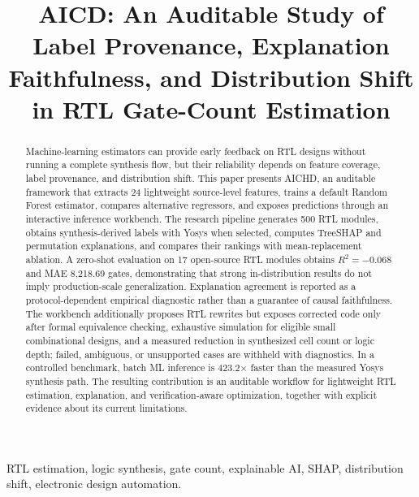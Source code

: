 \documentclass[conference]{IEEEtran}
\begin{document}
\title{AICD: An Auditable Study of Label Provenance, Explanation Faithfulness, and Distribution Shift in RTL Gate-Count Estimation}

\author{
}

\maketitle

\begin{abstract}
Machine-learning estimators can provide early feedback on RTL designs without running a complete synthesis flow, but their reliability depends on feature coverage, label provenance, and distribution shift. This paper presents AICHD, an auditable framework that extracts 24 lightweight source-level features, trains a default Random Forest estimator, compares alternative regressors, and exposes predictions through an interactive inference workbench. The research pipeline generates 500 RTL modules, obtains synthesis-derived labels with Yosys when selected, computes TreeSHAP and permutation explanations, and compares their rankings with mean-replacement ablation. A zero-shot evaluation on 17 open-source RTL modules obtains $R^2=-0.068$ and MAE 8,218.69 gates, demonstrating that strong in-distribution results do not imply production-scale generalization. Explanation agreement is reported as a protocol-dependent empirical diagnostic rather than a guarantee of causal faithfulness. The workbench additionally proposes RTL rewrites but exposes corrected code only after formal equivalence checking, exhaustive simulation for eligible small combinational designs, and a measured reduction in synthesized cell count or logic depth; failed, ambiguous, or unsupported cases are withheld with diagnostics. In a controlled benchmark, batch ML inference is 423.2$\times$ faster than the measured Yosys synthesis path. The resulting contribution is an auditable workflow for lightweight RTL estimation, explanation, and verification-aware optimization, together with explicit evidence about its current limitations.
\end{abstract}

\begin{IEEEkeywords}
RTL estimation, logic synthesis, gate count, explainable AI, SHAP, distribution shift, electronic design automation.
\end{IEEEkeywords}
\end{document}
